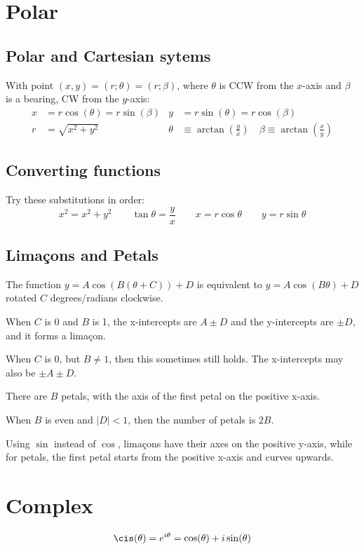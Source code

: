 \section{Polar}
\subsection{Polar and Cartesian sytems}
With point $(x, y) = (r; \theta) = (r; \beta)$, where $\theta$ is CCW from the $x$-axis and $\beta$ is a bearing, CW from the $y$-axis:
\[\begin{aligned}
	x &= r \cos(\theta) = r \sin(\beta) & y &= r \sin(\theta) = r \cos(\beta) \\
	r &= \sqrt{x^2 + y^2} & \theta &\equiv \arctan(\frac{y}{x}) \quad \beta \equiv \arctan(\frac{x}{y})
\end{aligned}\]
\subsection{Converting functions}

Try these substitutions in order:
\[
	x^2 = x^2 + y^2 \qquad \tan\theta = \frac{y}{x} \qquad
	x = r\cos\theta \qquad y = r\sin\theta
\]
\subsection{Limaçons and Petals}

The function $y = A \cos(B(\theta + C)) + D$ is equivalent to $y = A \cos(B\theta) + D$ rotated $C$ degrees/radians clockwise.

When $C$ is 0 and $B$ is 1, the x-intercepts are $A \pm D$ and the y-intercepts are $\pm D$, and it forms a limaçon.

When $C$ is 0, but $B \neq 1$, then this sometimes still holds. The x-intercepts may also be $\pm A \pm D$.

There are $B$ petals, with the axis of the first petal on the positive x-axis.

When $B$ is even and $|D| < 1$, then the number of petals is $2B$.

Using $\sin$ instead of $\cos$, limaçons have their axes on the positive y-axis, while for petals, the first petal starts from the positive x-axis and curves upwards.

\section{Complex}

\[
	\cis(\theta) = e^{i\theta} = \cos(\theta) + i \sin(\theta)
\]

